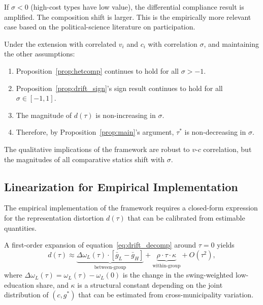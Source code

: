 If $\sigma < 0$ (high-cost types have low value), the differential compliance result is amplified. The composition shift is larger. This is the empirically more relevant case based on the political-science literature on participation.

\begin{proposition}
\label{prop:vc_corr}
Under the extension with correlated $v_i$ and $c_i$ with correlation $\sigma$, and maintaining the other assumptions:
\begin{enumerate}
    \item[(i)] Proposition~\ref{prop:hetcomp} continues to hold for all $\sigma > -1$.
    \item[(ii)] Proposition~\ref{prop:drift_sign}'s sign result continues to hold for all $\sigma \in [-1, 1]$.
    \item[(iii)] The magnitude of $d(\tau)$ is non-increasing in $\sigma$.
    \item[(iv)] Therefore, by Proposition~\ref{prop:main}'s argument, $\tau^*$ is non-decreasing in $\sigma$.
\end{enumerate}
\end{proposition}

The qualitative implications of the framework are robust to $v$-$c$ correlation, but the magnitudes of all comparative statics shift with $\sigma$.

\subsection{Linearization for Empirical Implementation}
\label{ssec:linearization}

The empirical implementation of the framework requires a closed-form expression for the representation distortion $d(\tau)$ that can be calibrated from estimable quantities.

A first-order expansion of equation~\eqref{eq:drift_decomp} around $\tau = 0$ yields
\begin{equation}
d(\tau) \approx \underbrace{\Delta\omega_L(\tau) \cdot [\bar g_L - \bar g_H]}_{\text{between-group}} + \underbrace{\rho \cdot \tau \cdot \kappa}_{\text{within-group}} + O(\tau^2),
\label{eq:linearized_drift}
\end{equation}
where $\Delta\omega_L(\tau) = \omega_L(\tau) - \omega_L(0)$ is the change in the swing-weighted low-education share, and $\kappa$ is a structural constant depending on the joint distribution of $(c, g^*)$ that can be estimated from cross-municipality variation.

